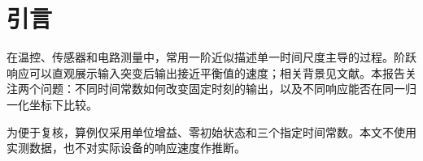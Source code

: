 \section{引言}

在温控、传感器和电路测量中，常用一阶近似描述单一时间尺度主导的过程。阶跃响应可以直观展示输入突变后输出接近平衡值的速度；相关背景见文献\parencite{astrom2008}。本报告关注两个问题：不同时间常数如何改变固定时刻的输出，以及不同响应能否在同一归一化坐标下比较。

为便于复核，算例仅采用单位增益、零初始状态和三个指定时间常数。本文不使用实测数据，也不对实际设备的响应速度作推断。
